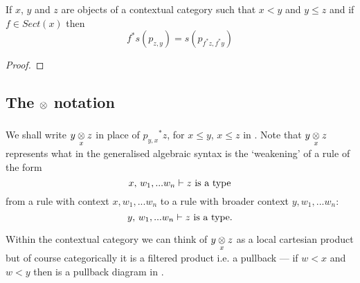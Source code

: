 \begin{lemma}
If $x$, $y$ and $z$ are objects of a contextual category \catcw such that $x <y$ and $y \leq z$ 
and if $f \in Sect(x)$ then
\begin{equation*}
f^*s(p_{z,y})=s(p_{f^*z,f^*y})
\end{equation*}
\end{lemma}
\begin{proof}
\tbd
\end{proof}


\subsection{The $\crossx{}{}{}$ notation}

We shall write $\crossx{y}{z}{x}$ in place of ${p_{y,x}}^*z$, for $x \leq y$, $x \leq z$  in \catc. 
Note that
$\crossx{y}{z}{x}$  represents what in the generalised algebraic syntax  is the `weakening' of a rule of the form
\begin{displaymath}
x,\, w_1,...w_n \tstyle \isT{z}
\end{displaymath}
from a rule with context $x, w_1,...w_n$ to a rule with broader context $y, w_1, ... w_n$: 
\begin{displaymath} 
y,\, w_1,...w_n \tstyle \isT{z}.
\end{displaymath}

\noindent Within the contextual category we can think of $\crossx{y}{z}{x}$  as a local cartesian product but of course categorically it is a filtered product i.e. a pullback --- if $w < x$ and $w < y$  then 
\genericcrossxproductdiagram %
is a pullback diagram in \ccat.


